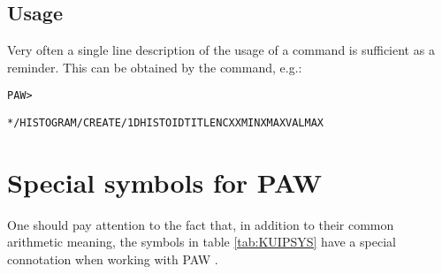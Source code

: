 \subsection{Usage}
 
Very often a single line description of the usage of a command 
is sufficient as a reminder. 
This can be obtained by the  command, e.g.:
\begin{alltt}
      PAW > 
 
      * /HISTOGRAM/CREATE/1DHISTO  ID TITLE NCX XMIN XMAX \lsb  VALMAX \rsb
\end{alltt}

\section{Special symbols for PAW}
\label{sec:SPESYMB}
 
One should pay attention to the fact that, 
in addition to their common arithmetic meaning,
the symbols in table \ref{tab:KUIPSYS} 
have a special connotation when working with PAW .

